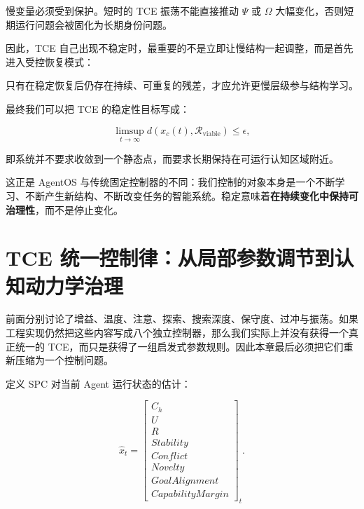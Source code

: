\begin{statementbox}
\centering
{}
\end{statementbox}

慢变量必须受到保护。短时的 TCE 振荡不能直接推动 $\Psi$ 或 $\Omega$ 大幅变化，否则短期运行问题会被固化为长期身份问题。

因此，TCE 自己出现不稳定时，最重要的不是立即让慢结构一起调整，而是首先进入受控恢复模式：

\begin{statementbox}
\centering
{}
\end{statementbox}

只有在稳定恢复后仍存在持续、可重复的残差，才应允许更慢层级参与结构学习。

最终我们可以把 TCE 的稳定性目标写成：

\[
\boxed{
\limsup_{t\rightarrow\infty}
d
\left(
x_c(t),
\mathcal R_{\mathrm{viable}}
\right)
\le
\epsilon,
}
\]

即系统并不要求收敛到一个静态点，而要求长期保持在可运行认知区域附近。

这正是 AgentOS 与传统固定控制器的不同：我们控制的对象本身是一个不断学习、不断产生新结构、不断改变任务的智能系统。稳定意味着\textbf{在持续变化中保持可治理性}，而不是停止变化。

\section{TCE 统一控制律：从局部参数调节到认知动力学治理}

前面分别讨论了增益、温度、注意、探索、搜索深度、保守度、过冲与振荡。如果工程实现仍然把这些内容写成八个独立控制器，那么我们实际上并没有获得一个真正统一的 TCE，而只是获得了一组启发式参数规则。因此本章最后必须把它们重新压缩为一个控制问题。

定义 SPC 对当前 Agent 运行状态的估计：

\[
\hat x_t
=
\begin{bmatrix}
C_h\\
U\\
R\\
Stability\\
Conflict\\
Novelty\\
GoalAlignment\\
CapabilityMargin
\end{bmatrix}_t.
\]

